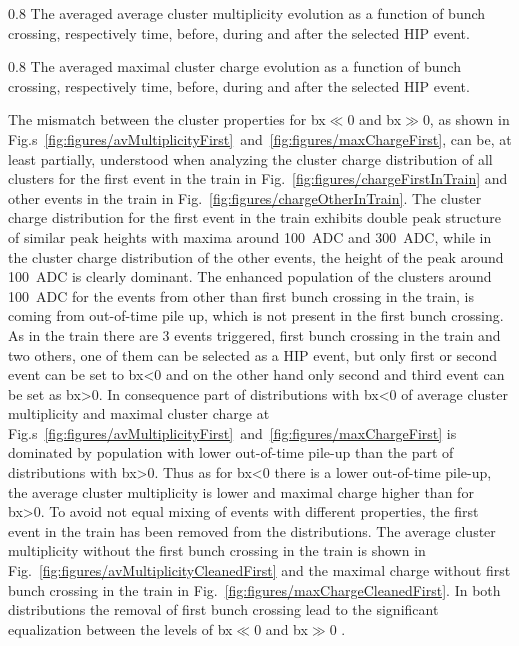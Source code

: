

                 {0.8}       %
                 {The averaged average cluster multiplicity evolution as a function of bunch crossing, respectively time, before, during and after the selected HIP event. } %

                 {0.8}       %
                 {The averaged maximal cluster charge evolution as a function of bunch crossing, respectively time, before, during and after the selected HIP event. } %

The mismatch between the cluster properties for bx$\ll$0 and bx$\gg$0, as shown in Fig.s~\ref{fig:figures/avMultiplicityFirst}~and~\ref{fig:figures/maxChargeFirst}, can be, at least partially, understood when analyzing the cluster charge distribution of all clusters for the first event in the train in Fig.~\ref{fig:figures/chargeFirstInTrain} and other events in the train in Fig.~\ref{fig:figures/chargeOtherInTrain}. The cluster charge distribution for the first event in the train exhibits double peak structure of similar peak heights with maxima around 100~ADC and 300~ADC, while in the cluster charge distribution of the other events, the height of the peak around 100~ADC is clearly dominant. The enhanced population of the clusters around 100~ADC for the events from other than first bunch crossing in the train, is coming from out-of-time pile up, which is not present in the first bunch crossing. As in the train there are 3 events triggered, first bunch crossing in the train and two others, one of them can be selected as a HIP event, but only first or second event can be set to bx<0 and on the other hand only second and third event can be set as bx>0. In consequence part of distributions with bx<0 of average cluster multiplicity and maximal cluster charge at Fig.s~\ref{fig:figures/avMultiplicityFirst}~and~\ref{fig:figures/maxChargeFirst} is dominated by population with lower out-of-time pile-up than the part of distributions with bx>0. Thus as for bx<0 there is a lower out-of-time pile-up, the average cluster multiplicity is lower and maximal charge higher than for bx>0. To avoid not equal mixing of events with different properties, the first event in the train has been removed from the distributions. The average cluster multiplicity without the first bunch crossing in the train is shown in Fig.~\ref{fig:figures/avMultiplicityCleanedFirst} and the maximal charge without first bunch crossing in the train in Fig.~\ref{fig:figures/maxChargeCleanedFirst}. In both distributions the removal of first bunch crossing lead to the significant equalization between the levels of bx$\ll$0 and bx$\gg$0 .

